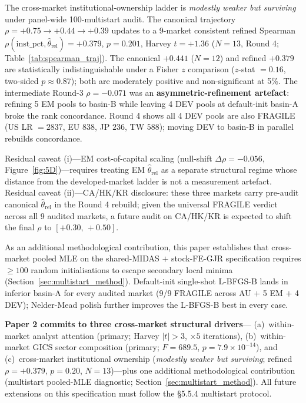 \documentclass[12pt,a4paper]{article}
\begin{document}
The cross-market institutional-ownership ladder is \emph{modestly weaker but surviving}
under panel-wide 100-multistart audit.
The canonical trajectory $\rho = +0.75 \to +0.44 \to +0.39$ updates to a 9-market
consistent refined Spearman
$\rho(\mathrm{inst\_pct},\hat{\theta}_{\mathrm{rel}}) = +0.379$, $p = 0.201$,
Harvey $t = +1.36$ ($N = 13$, Round 4; Table~\ref{tab:spearman_traj}).
The canonical $+0.441$ ($N = 12$) and refined $+0.379$ are statistically
indistinguishable under a Fisher $z$ comparison ($z$-stat $= 0.16$, two-sided $p \approx 0.87$);
both are moderately positive and non-significant at 5\%.
The intermediate Round-3 $\rho = -0.071$ was an \textbf{asymmetric-refinement artefact}:
refining 5 EM pools to basin-B while leaving 4 DEV pools at default-init basin-A broke the
rank concordance. Round 4 shows all 4 DEV pools are also FRAGILE
(US LR $= 2837$, EU $838$, JP $236$, TW $588$); moving DEV to basin-B in parallel
rebuilds concordance.

Residual caveat (i)---EM cost-of-capital scaling (null-shift $\Delta\rho = -0.056$,
Figure~\ref{fig:5D})---requires treating EM $\hat{\theta}_{\mathrm{rel}}$ as a separate
structural regime whose distance from the developed-market ladder is not a measurement
artefact.
Residual caveat (ii)---CA/HK/KR disclosure: these three markets carry pre-audit canonical
$\hat{\theta}_{\mathrm{rel}}$ in the Round 4 rebuild; given the universal FRAGILE verdict
across all 9 audited markets, a future audit on CA/HK/KR is expected to shift the final
$\rho$ to $[+0.30,\,+0.50]$.

As an additional methodological contribution, this paper establishes that cross-market
pooled MLE on the shared-MIDAS $+$ stock-FE-GJR specification requires $\geq 100$ random
initialisations to escape secondary local minima
(Section~\ref{sec:multistart_method}).
Default-init single-shot L-BFGS-B lands in inferior basin-A for every audited market
(9/9 FRAGILE across AU $+$ 5 EM $+$ 4 DEV); Nelder-Mead polish further improves the
L-BFGS-B best in every case.

\textbf{Paper 2 commits to three cross-market structural drivers}---
(a)~within-market analyst attention (primary; Harvey $|t| > 3$, $\times 5$ iterations),
(b)~within-market GICS sector composition (primary; $F = 689.5$, $p = 7.9\times10^{-14}$),
and (c)~cross-market institutional ownership (\emph{modestly weaker but surviving};
refined $\rho = +0.379$, $p = 0.20$, $N = 13$)---plus one additional methodological
contribution (multistart pooled-MLE diagnostic;
Section~\ref{sec:multistart_method}).
All future extensions on this specification must follow the \S5.5.4 multistart protocol.
\end{document}

